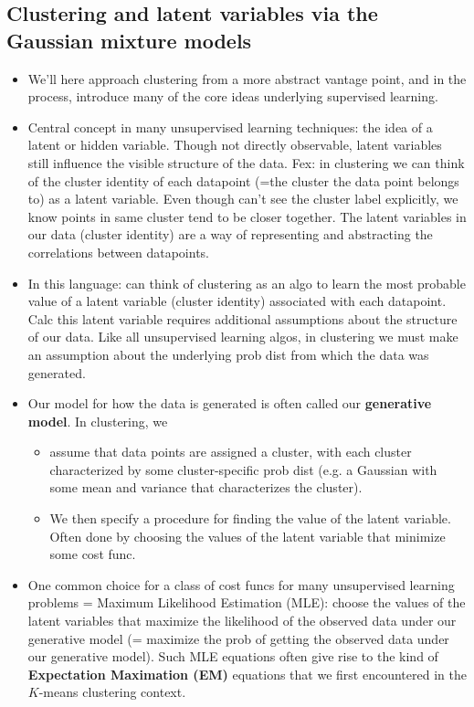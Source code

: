 \documentclass[norsk,a4paper,11pt]{article}
\begin{document}
\subsection{Clustering and latent variables via the Gaussian mixture models}
\begin{itemize}
	\item We'll here approach clustering from a more abstract vantage point, and in the process, introduce many of the core ideas underlying supervised learning. 
	\item Central concept in many unsupervised learning techniques: the idea of a latent or hidden variable. Though not directly observable, latent variables still influence the visible structure of the data. Fex: in clustering we can think of the cluster identity of each datapoint (=the cluster the data point belongs to) as a latent variable. Even though can't see the cluster label explicitly, we know points in same cluster tend to be closer together. The latent variables in our data (cluster identity) are a way of representing and abstracting the correlations between datapoints.
	\item In this language: can think of clustering as an algo to learn the most probable value of a latent variable (cluster identity) associated with each datapoint. Calc this latent variable requires additional assumptions about the structure of our data. Like all unsupervised learning algos, in clustering we must make an assumption about the underlying prob dist from which the data was generated. 
	\item Our model for how the data is generated is often called our \textbf{generative model}. In clustering, we
	\begin{itemize}
		\item assume that data points are assigned a cluster, with each cluster characterized by some cluster-specific prob dist (e.g. a Gaussian with some mean and variance that characterizes the cluster).  
		\item We then specify a procedure for finding the value of the latent variable. Often done by choosing the values of the latent variable that minimize some cost func.
	\end{itemize}
	\item One common choice for a class of cost funcs for many unsupervised learning problems = Maximum Likelihood Estimation (MLE): choose the values of the latent variables that maximize the likelihood of the observed data under our generative model (= maximize the prob of getting the observed data under our generative model). Such MLE equations often give rise to the kind of \textbf{Expectation Maximation (EM)} equations that we first encountered in the $K$-means clustering context.

\end{itemize}
\end{document}
